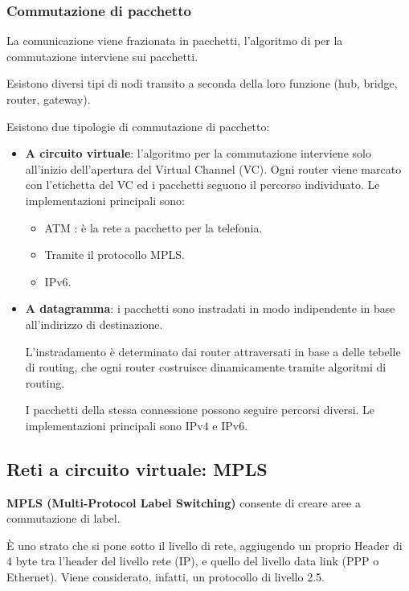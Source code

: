         \subsubsection{Commutazione di pacchetto}
            La comunicazione viene frazionata in pacchetti, l'algoritmo di per la commutazione interviene sui pacchetti.
        
            Esistono diversi tipi di nodi transito a seconda della loro funzione (hub, bridge, router, gateway).
        
            Esistono due tipologie di commutazione di pacchetto:
            \begin{itemize}
                \item \textbf{A circuito virtuale}: l'algoritmo per la commutazione interviene solo all'inizio dell'apertura del Virtual Channel (VC).
                Ogni router viene marcato con l'etichetta del VC ed i pacchetti seguono il percorso individuato. Le implementazioni principali sono:
                \begin{itemize}
                    \item ATM : è la rete a pacchetto per la telefonia.
                    \item Tramite il protocollo MPLS.
                    \item IPv6.
                \end{itemize}
                \item \textbf{A datagramma}: i pacchetti sono instradati in modo indipendente in base all'indirizzo di destinazione.
                
                L'instradamento è determinato dai router attraversati in base a delle tebelle di routing, che ogni router costruisce dinamicamente tramite algoritmi di routing.
                
                I pacchetti della stessa connessione possono seguire percorsi diversi. Le implementazioni principali sono IPv4 e IPv6.
            \end{itemize}

    \subsection{Reti a circuito virtuale: MPLS}
        \textbf{MPLS (Multi-Protocol Label Switching)} consente di creare aree a commutazione di label.
    
        È uno strato che si pone sotto il livello di rete, aggiugendo un proprio Header di 4 byte tra l'header del livello rete (IP), e quello del livello data link (PPP o Ethernet). Viene considerato, infatti, un protocollo di livello 2.5.
    
